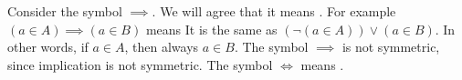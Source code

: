 
Consider the symbol $\implies$.
We will agree that it means .
For example $(a \in A) \implies (a \in B)$ means 
It is the same as $(\neg(a \in A)) \lor (a \in B)$.
In other words, if $a \in A$, then always $a \in B$.
The symbol $\implies$ is not symmetric, since implication is not symmetric.
The symbol $\iff$ means .

%
%
%
